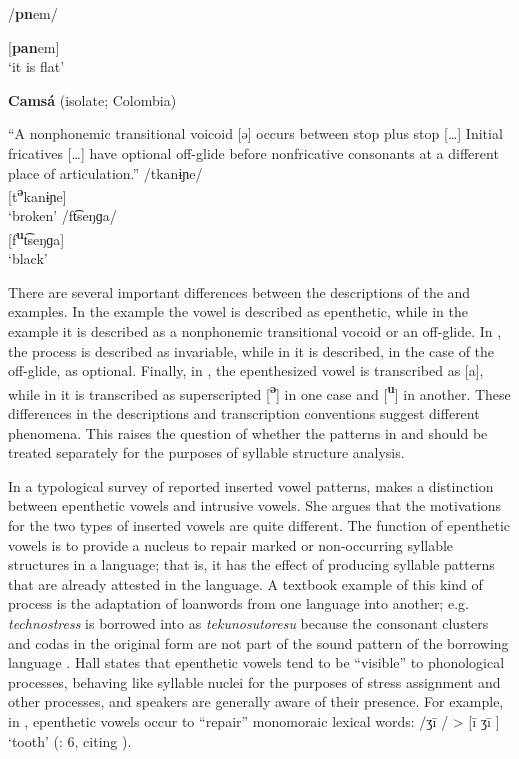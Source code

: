 /\textbf{pn}em/

[\textbf{pan}em]\\
\glt ‘it is flat’
\citep[35-6]{Dol2007}
\z

\ea\label{ex:3.9}
  \textbf{Camsá} (isolate; Colombia)

“A nonphonemic transitional voicoid [ə] occurs between stop plus stop […] Initial fricatives […] have optional off-glide before nonfricative consonants at a different place of articulation.” 
\ea   /tkanɨɲe/\\{}
  [t\textbf{\textsuperscript{ə}}kanɨɲe]\\
\glt  ‘broken’
\ex   /ft͡seŋɡa/\\{}
  [f\textbf{\textsuperscript{u}}t͡seŋɡa]\\
\glt  ‘black’
\citep[81]{Howard1967}
\z
\z

  There are several important differences between the descriptions of the  and  examples. In the  example the vowel is described as epenthetic, while in the  example it is described as a nonphonemic transitional vocoid or an off-glide. In , the process is described as invariable, while in  it is described, in the case of the off-glide, as optional. Finally, in , the epenthesized vowel is transcribed as [a], while in  it is transcribed as superscripted [\textbf{\textsuperscript{ə}}] in one case and [\textbf{\textsuperscript{u}}] in another. These differences in the descriptions and transcription conventions suggest different phenomena. This raises the question of whether the patterns in  and  should be treated separately for the purposes of syllable structure analysis.

  In a typological survey of reported inserted vowel patterns, \citet{Hall2006} makes a distinction between epenthetic vowels and intrusive vowels. She argues that the motivations for the two types of inserted vowels are quite different. The function of epenthetic vowels is to provide a nucleus to repair marked or non-occurring syllable structures in a language; that is, it has the effect of producing syllable patterns that are already attested in the language. A textbook example of this kind of process is the adaptation of loanwords from one language into another; e.g.  \textit{technostress} is borrowed into  as \textit{tekunosutoresu} because the consonant clusters and codas in the original form are not part of the sound pattern of the borrowing language \citep[69]{Kay1995}. Hall states that epenthetic vowels tend to be ``visible'' to phonological processes, behaving like syllable nuclei for the purposes of stress assignment and other processes, and speakers are generally aware of their presence. For example, in , epenthetic vowels occur to ``repair'' monomoraic lexical words: /ʒi\={} / > [i\={} ʒi\={} ] ‘tooth’ (\citealt{Hall2006}: 6, citing \citealt{Olson2003}).

